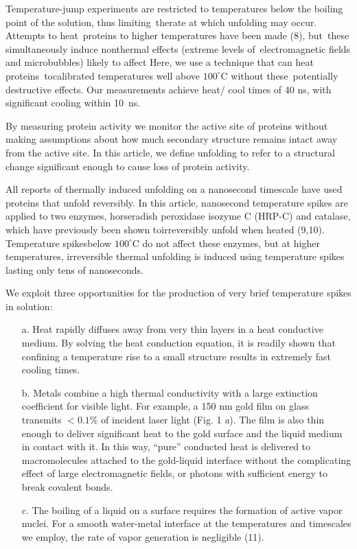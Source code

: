 \documentclass{biophys}
\begin{document}
Temperature-jump experiments are restricted to temperatures below the boiling point of the solution, thus limiting~the\break rate at which unfolding may occur. Attempts to heat~pro\-teins to higher temperatures have been made (8), but~these simul\-taneously induce nonthermal effects (extreme levels of~elec\-tromagnetic fields and microbubbles) likely to affect  Here, we use a technique that can heat proteins~to\break calibrated temperatures well above $100^\circ$C without these~po\-tentially destructive effects. Our measurements achieve heat/ cool times of 40 ns, with significant cooling within 10~ns.

By measuring protein activity we monitor the active site of proteins without making assumptions about how much secondary structure remains intact away from the active site. In this article, we define unfolding to refer to a structural change significant enough to cause loss of protein activity.

All reports of thermally induced unfolding on a nanosecond timescale have used proteins that unfold reversibly. In this article, nanosecond temperature spikes are applied to two enzymes, horseradish peroxidase isozyme C (HRP-C) and catalase, which have previously been shown to\break irreversibly unfold when heated (9,10). Temperature spikes\break below $100^\circ$C do not affect these enzymes, but at higher temperatures, irreversible thermal unfolding is induced using temperature spikes lasting only tens of nanoseconds.

We exploit three opportunities for the production of very brief temperature spikes in solution:
\begin{itemize}
\item[a.] Heat rapidly diffuses away from very thin layers in a heat conductive medium. By solving the heat conduction equation, it is readily shown that confining a temperature rise to a small structure results in extremely fast cooling times.

\item[b.] Metals combine a high thermal conductivity with a large extinction coefficient for visible light. For example, a 150 nm gold film on glass transmits $<0.1\%$ of incident laser light (Fig. 1 {\it a}). The film is also thin enough to deliver significant heat to the gold surface and the liquid medium in contact with it. In this way, ``pure'' conducted heat is delivered to macromolecules attached to the gold-liquid interface without the complicating effect of large electromagnetic fields, or photons with sufficient energy to break covalent bonds.

\item[c.] The boiling of a liquid on a surface requires the formation of active vapor nuclei. For a smooth water-metal interface at the temperatures and timescales we employ, the rate of vapor generation is negligible (11).
\end{itemize}
\end{document}
